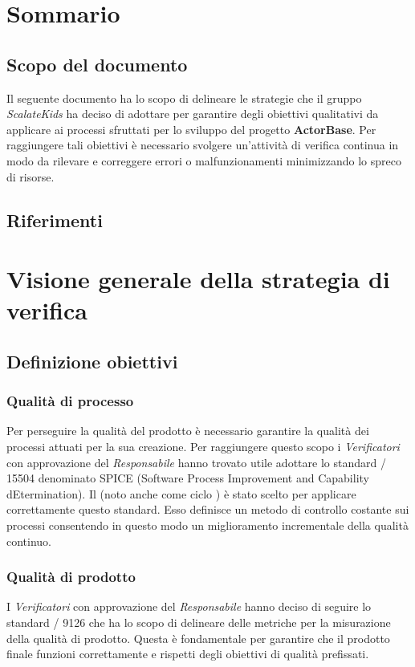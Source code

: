 \documentclass{scalatekids-article}
\begin{document}
\section{Sommario}
\subsection{Scopo del documento}
Il seguente documento ha lo scopo di delineare le strategie che il gruppo \textit{ScalateKids} ha deciso di adottare per garantire degli obiettivi qualitativi da applicare ai processi sfruttati per lo sviluppo del progetto \textbf{ActorBase}. Per raggiungere tali obiettivi è necessario svolgere un'attività di verifica continua in modo da rilevare e correggere errori o malfunzionamenti minimizzando lo spreco di risorse.
\prodPurpose
\glossExpl
\subsection{Riferimenti}
\newpage
\section{Visione generale della strategia di verifica}
\subsection{Definizione obiettivi}
\subsubsection{Qualità di processo}
Per perseguire la qualità del prodotto è necessario garantire la qualità dei processi attuati per la sua creazione. Per raggiungere questo scopo i \textit{Verificatori} con approvazione del \textit{Responsabile} hanno trovato utile adottare lo standard / 15504 denominato SPICE (Software Process Improvement and Capability dEtermination). Il  (noto anche come ciclo ) è stato scelto per applicare correttamente questo standard. Esso definisce un metodo di controllo costante sui processi consentendo in questo modo un miglioramento incrementale della qualità continuo.
\subsubsection{Qualità di prodotto}
I \textit{Verificatori} con approvazione del \textit{Responsabile} hanno deciso di seguire lo standard / 9126 che ha lo scopo di delineare delle metriche per la misurazione della qualità di prodotto. Questa è fondamentale per garantire che il prodotto  finale funzioni correttamente e rispetti degli obiettivi di qualità prefissati.
\end{document}
